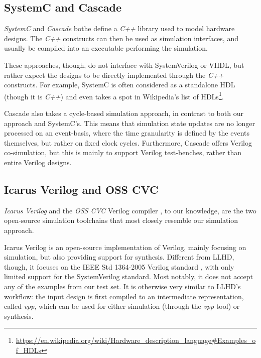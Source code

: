 

\subsection{SystemC and Cascade}
\textit{SystemC} \cite{systemc} and \textit{Cascade} \cite{Grossman2013}  bothe define a \textit{C++} library used to model hardware designs. The \textit{C++} constructs can then be used as simulation interfaces, and usually be compiled into an executable performing the simulation.

These approaches, though, do not interface with SystemVerilog or VHDL, but rather expect the designs to be directly implemented through the \textit{C++} constructs. For example, SystemC is often considered as a standalone HDL (though it is \textit{C++}) and even takes a spot in Wikipedia's list of HDLs\footnote{\url{https://en.wikipedia.org/wiki/Hardware_description_language\#Examples_of_HDLs}}.

Cascade also takes a cycle-based simulation approach, in contrast to both our approach and SystemC's. This means that simulation state updates are no longer processed on an event-basis, where the time granularity is defined by the events themselves, but rather on fixed clock cycles. Furthermore, Cascade offers Verilog co-simulation, but this is mainly to support Verilog test-benches, rather than entire Verilog designs.


\subsection{Icarus Verilog and OSS CVC}
\textit{Icarus Verilog} \cite{icarus} and the \textit{OSS CVC} Verilog compiler \cite{Meyer2016}, to our knowledge, are the two open-source simulation toolchains that most closely resemble our simulation approach.

Icarus Verilog is an open-source implementation of Verilog, mainly focusing on simulation, but also providing support for synthesis. Different from LLHD, though, it focuses on the IEEE Std 1364-2005 Verilog standard \cite{V2006}, with only limited support for the SystemVerilog standard. Most notably, it does not accept any of the examples from our test set. It is otherwise very similar to LLHD's workflow: the input design is first compiled to an intermediate representation, called \textit{vpp}, which can be used for either simulation (through the \textit{vpp} tool) or synthesis.

